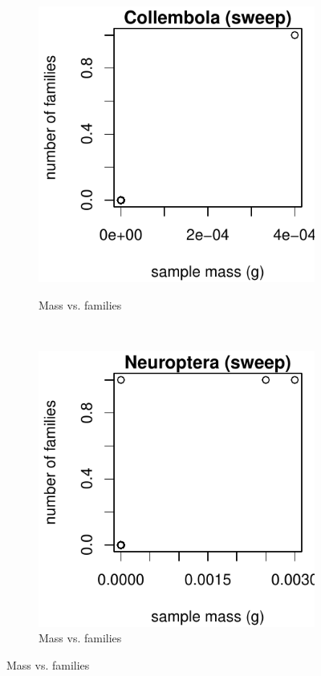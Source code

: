 \documentclass[10pt,letterpaper,twocolumn]{article}
\begin{document}
\begin{figure}[h]
	\centering
	\begin{subfigure}[b]{0.15\textwidth}
		\caption{Mass vs. families}
		\includegraphics[width=\textwidth]{plots/mass-vs-count/scatter/2015_sweep_Collembola_mass-vs-count.pdf}
		\label{fig:sweep_collembola_scatter}
	\end{subfigure}
	~
	\begin{subfigure}[b]{0.15\textwidth}
		\caption{Mass vs. families}
		\includegraphics[width=\textwidth]{plots/mass-vs-count/scatter/2015_sweep_Neuroptera_mass-vs-count.pdf}

\end{subfigure}
\end{figure}
\end{document}
